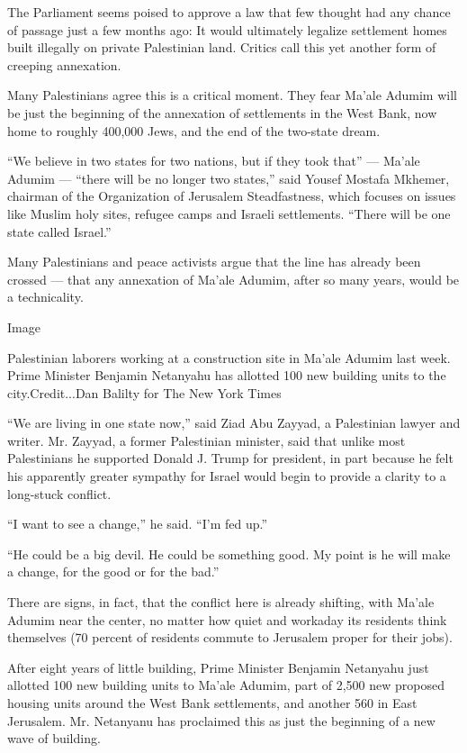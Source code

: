 The Parliament seems poised to approve a law that few thought had any
chance of passage just a few months ago: It would ultimately legalize
settlement homes built illegally on private Palestinian land. Critics
call this yet another form of creeping annexation.

Many Palestinians agree this is a critical moment. They fear Ma'ale
Adumim will be just the beginning of the annexation of settlements in
the West Bank, now home to roughly 400,000 Jews, and the end of the
two-state dream.

``We believe in two states for two nations, but if they took that'' ---
Ma'ale Adumim --- ``there will be no longer two states,'' said Yousef
Mostafa Mkhemer, chairman of the Organization of Jerusalem
Steadfastness, which focuses on issues like Muslim holy sites, refugee
camps and Israeli settlements. ``There will be one state called
Israel.''

Many Palestinians and peace activists argue that the line has already
been crossed --- that any annexation of Ma'ale Adumim, after so many
years, would be a technicality.

Image

Palestinian laborers working at a construction site in Ma'ale Adumim
last week. Prime Minister Benjamin Netanyahu has allotted 100 new
building units to the city.Credit...Dan Balilty for The New York Times

``We are living in one state now,'' said Ziad Abu Zayyad, a Palestinian
lawyer and writer. Mr. Zayyad, a former Palestinian minister, said that
unlike most Palestinians he supported Donald J. Trump for president, in
part because he felt his apparently greater sympathy for Israel would
begin to provide a clarity to a long-stuck conflict.

``I want to see a change,'' he said. ``I'm fed up.''

``He could be a big devil. He could be something good. My point is he
will make a change, for the good or for the bad.''

There are signs, in fact, that the conflict here is already shifting,
with Ma'ale Adumim near the center, no matter how quiet and workaday its
residents think themselves (70 percent of residents commute to Jerusalem
proper for their jobs).

After eight years of little building, Prime Minister Benjamin Netanyahu
just allotted 100 new building units to Ma'ale Adumim, part of 2,500 new
proposed housing units around the West Bank settlements, and another 560
in East Jerusalem. Mr. Netanyanu has proclaimed this as just the
beginning of a new wave of building.

